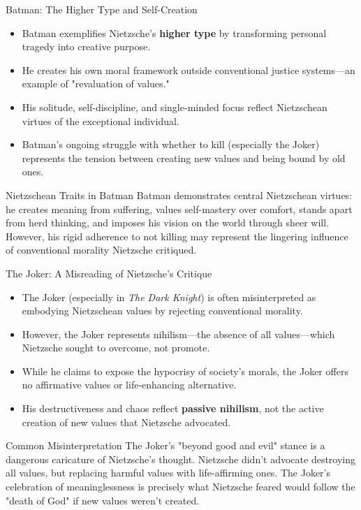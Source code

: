 \documentclass{beamer}
\begin{document}
\begin{frame}{Batman: The Higher Type and Self-Creation}
    \begin{itemize}
    \item Batman exemplifies Nietzsche's \textbf{higher type} by transforming personal tragedy into creative purpose.
    \item He creates his own moral framework outside conventional justice systems—an example of "revaluation of values."
    \item His solitude, self-discipline, and single-minded focus reflect Nietzschean virtues of the exceptional individual.
    \item Batman's ongoing struggle with whether to kill (especially the Joker) represents the tension between creating new values and being bound by old ones.
    \end{itemize}
    
    \begin{exampleblock}{Nietzschean Traits in Batman}
    Batman demonstrates central Nietzschean virtues: he creates meaning from suffering, values self-mastery over comfort, stands apart from herd thinking, and imposes his vision on the world through sheer will. However, his rigid adherence to not killing may represent the lingering influence of conventional morality Nietzsche critiqued.
    \end{exampleblock}
    \end{frame}

\begin{frame}{The Joker: A Misreading of Nietzsche's Critique}
    \begin{itemize}
    \item The Joker (especially in \textit{The Dark Knight}) is often misinterpreted as embodying Nietzschean values by rejecting conventional morality.
    \item However, the Joker represents nihilism—the absence of all values—which Nietzsche sought to overcome, not promote.
    \item While he claims to expose the hypocrisy of society's morals, the Joker offers no affirmative values or life-enhancing alternative.
    \item His destructiveness and chaos reflect \textbf{passive nihilism}, not the active creation of new values that Nietzsche advocated.
    \end{itemize}
    
    \begin{alertblock}{Common Misinterpretation}
    The Joker's "beyond good and evil" stance is a dangerous caricature of Nietzsche's thought. Nietzsche didn't advocate destroying all values, but replacing harmful values with life-affirming ones. The Joker's celebration of meaninglessness is precisely what Nietzsche feared would follow the "death of God" if new values weren't created.
    \end{alertblock}
    \end{frame}
\end{document}
